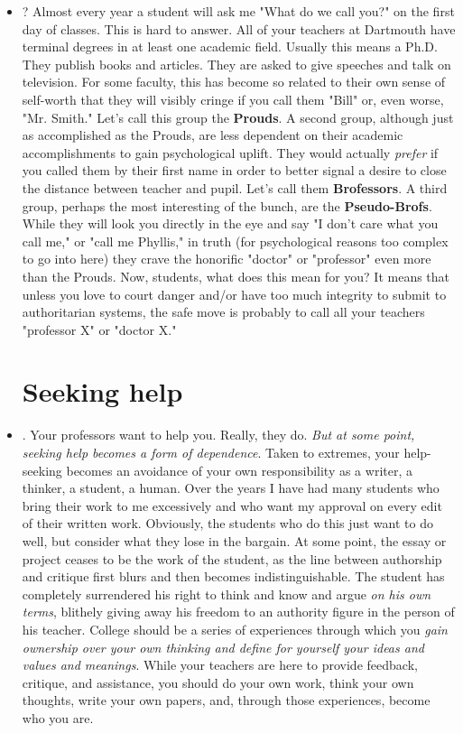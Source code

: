 \begin{itemize}
\item {}? Almost every year a student will ask me "What do we call you?" on the first day of classes. This is hard to answer. All of your teachers at Dartmouth have terminal degrees in at least one academic field. Usually this means a Ph.D. They publish books and articles. They are asked to give speeches and talk on television. For some faculty, this has become so related to their own sense of self-worth that they will visibly cringe if you call them "Bill" or, even worse, "Mr. Smith." Let's call this group the \textbf{Prouds}. A second group, although just as accomplished as the Prouds, are less dependent on their academic accomplishments to gain psychological uplift. They would actually \emph{prefer} if you called them by their first name in order to better signal a desire to close the distance between teacher and pupil. Let's call them \textbf{Brofessors}. A third group, perhaps the most interesting of the bunch, are the \textbf{Pseudo-Brofs}. While they will look you directly in the eye and say "I don't care what you call me," or "call me Phyllis," in truth (for psychological reasons too complex to go into here) they crave the honorific "doctor" or "professor" even more than the Prouds. Now, students, what does this mean for you? It means that unless you love to court danger and/or have too much integrity to submit to authoritarian systems, the safe move is probably to call all your teachers "professor X" or "doctor X."


\section{Seeking help}

\item {}. Your professors want to help you. Really, they do. \emph{But at some point, seeking help becomes a form of dependence}. Taken to extremes, your help-seeking becomes an avoidance of your own responsibility as a writer, a thinker, a student, a human. Over the years I have had many students who bring their work to me excessively and who want my approval on every edit of their written work. Obviously, the students who do this just want to do well, but consider what they lose in the bargain. At some point, the essay or project ceases to be the work of the student, as the line between authorship and critique first blurs and then becomes indistinguishable. The student has completely surrendered his right to think and know and argue \emph{on his own terms}, blithely giving away his freedom to an authority figure in the person of his teacher. College should be a series of experiences through which you \emph{gain ownership over your own thinking and define for yourself your ideas and values and meanings}. While your teachers are here to provide feedback, critique, and assistance, you should do your own work, think your own thoughts, write your own papers, and, through those experiences, become who you are.  


\end{itemize}
